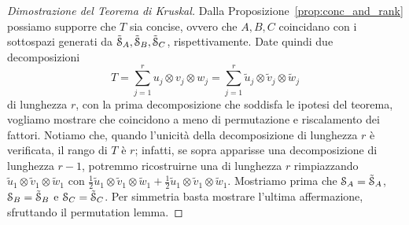 \begin{proof}[Dimostrazione del Teorema di Kruskal]
	Dalla Proposizione~\ref{prop:conc_and_rank} possiamo supporre che $ T $ sia concise, ovvero che $
		A,B,C $ coincidano con i sottospazi generati da $ \tilde{\mathcal{S}}_{A},\tilde{\mathcal{S}}_{B},\tilde{\mathcal{S}}_{C} $, rispettivamente. Date
	quindi due decomposizioni
	\begin{equation}
		\label{eq:not_tensor_uniq}
		T = \sum_{j=1}^r u_j \otimes v_j \otimes w_j = \sum_{j=1}^r \tilde{u}_j \otimes \tilde{v}_j
		\otimes \tilde{w}_j
	\end{equation}
	di lunghezza $ r $, con la prima decomposizione che soddisfa le ipotesi del teorema, vogliamo mostrare
	che coincidono a meno di permutazione e riscalamento dei fattori. Notiamo che, quando l'unicità della decomposizione di
	lunghezza $ r $ è verificata, il rango di $ T $ è $ r $; infatti, se sopra apparisse una decomposizione di lunghezza $ r-1 $, potremmo
	ricostruirne una di lunghezza $ r $ rimpiazzando $ \tilde{u}_1 \otimes \tilde{v}_1 \otimes
		\tilde{w}_1 $ con $ \frac{1}{2} \tilde{u}_1 \otimes \tilde{v}_1 \otimes \tilde{w}_1 + \frac{1}{2}
		\tilde{u}_1 \otimes \tilde{v}_1 \otimes \tilde{w}_1 $. Mostriamo prima che $ \mathcal{S}_A = \tilde{\mathcal{S}}_A
	$, $ \mathcal{S}_B = \tilde{\mathcal{S}}_B$ e $ \mathcal{S}_C = \tilde{\mathcal{S}}_C $. Per simmetria basta mostrare l'ultima
	affermazione, sfruttando il permutation lemma.


\end{proof}
